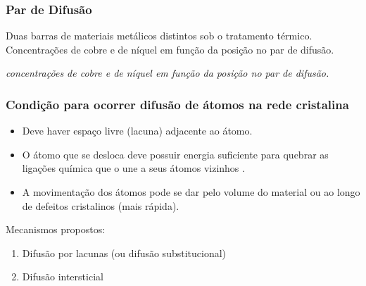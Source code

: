 \subsubsection{Par de Difusão}

Duas barras de materiais metálicos  distintos sob o tratamento térmico. Concentrações de cobre e de níquel em função da posição no par de difusão. 

\textit{concentrações de cobre e de níquel em função da posição no par de difusão.}


\subsubsection{Condição para ocorrer difusão de átomos na rede cristalina}

\begin{itemize}
	\item Deve haver espaço livre (lacuna) adjacente ao átomo.
	\item O átomo que se desloca deve possuir energia suficiente para quebrar as ligações química que o une a seus átomos vizinhos .
	\item A movimentação dos átomos pode se dar pelo volume do material ou ao longo de defeitos cristalinos (mais rápida).
\end{itemize}


Mecanismos propostos:

\begin{enumerate}
	\item Difusão por lacunas (ou difusão substitucional)
	\item Difusão intersticial
	
\end{enumerate}



